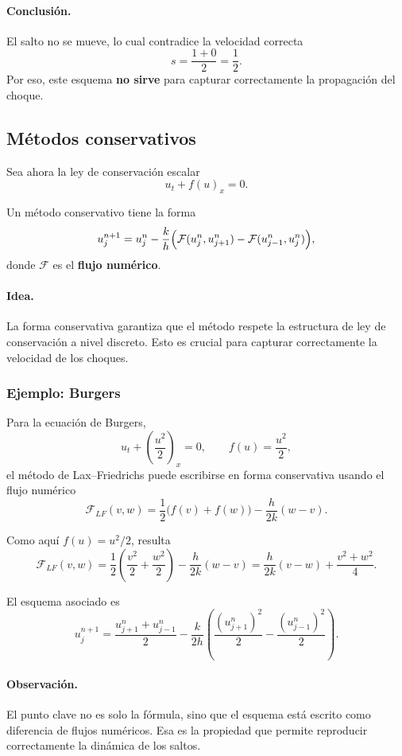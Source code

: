 \paragraph{Conclusión.}
El salto no se mueve, lo cual contradice la velocidad correcta
\[
s=\frac{1+0}{2}=\frac12.
\]
Por eso, este esquema \textbf{no sirve} para capturar correctamente la propagación del choque.

\subsection{Métodos conservativos}

Sea ahora la ley de conservación escalar
\[
u_t+f(u)_x=0.
\]

Un método conservativo tiene la forma
\[
u_j^{n+1}
=
u_j^n
-\frac{k}{h}\Bigl(
\mathcal{F}(u_j^n,u_{j+1}^n)
-
\mathcal{F}(u_{j-1}^n,u_j^n)
\Bigr),
\]
donde \(\mathcal{F}\) es el \textbf{flujo numérico}.

\paragraph{Idea.}
La forma conservativa garantiza que el método respete la estructura de ley de conservación a nivel discreto. Esto es crucial para capturar correctamente la velocidad de los choques.

\subsubsection{Ejemplo: Burgers}

Para la ecuación de Burgers,
\[
u_t+\left(\frac{u^2}{2}\right)_x=0,
\qquad
f(u)=\frac{u^2}{2},
\]
el método de Lax--Friedrichs puede escribirse en forma conservativa usando el flujo numérico
\[
\mathcal{F}_{LF}(v,w)
=
\frac{1}{2}\bigl(f(v)+f(w)\bigr)-\frac{h}{2k}(w-v).
\]

Como aquí \(f(u)=u^2/2\), resulta
\[
\mathcal{F}_{LF}(v,w)
=
\frac{1}{2}\left(\frac{v^2}{2}+\frac{w^2}{2}\right)-\frac{h}{2k}(w-v)
=
\frac{h}{2k}(v-w)+\frac{v^2+w^2}{4}.
\]

El esquema asociado es
\[
u_j^{n+1}
=
\frac{u_{j+1}^n+u_{j-1}^n}{2}
-\frac{k}{2h}
\left(
\frac{(u_{j+1}^n)^2}{2}
-
\frac{(u_{j-1}^n)^2}{2}
\right).
\]

\paragraph{Observación.}
El punto clave no es solo la fórmula, sino que el esquema está escrito como diferencia de flujos numéricos. Esa es la propiedad que permite reproducir correctamente la dinámica de los saltos.

